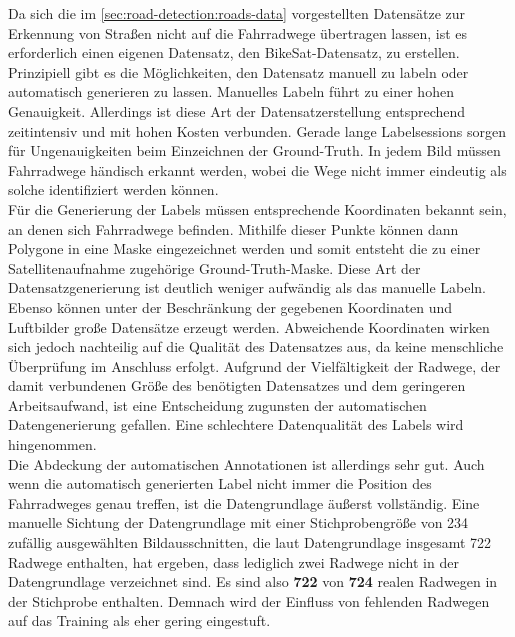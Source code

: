 Da sich die im \autoref{sec:road-detection:roads-data} vorgestellten Datensätze zur Erkennung von Straßen nicht auf die Fahrradwege übertragen lassen, 
ist es erforderlich einen eigenen Datensatz, den BikeSat-Datensatz, zu erstellen.
Prinzipiell gibt es die Möglichkeiten, den Datensatz manuell zu labeln oder automatisch generieren zu lassen.
Manuelles Labeln führt zu einer hohen Genauigkeit.
Allerdings ist diese Art der Datensatzerstellung entsprechend zeitintensiv und mit hohen Kosten verbunden.
Gerade lange Labelsessions sorgen für Ungenauigkeiten beim Einzeichnen der Ground-Truth. 
In jedem Bild müssen Fahrradwege händisch erkannt werden, wobei die Wege nicht immer eindeutig als solche identifiziert werden können.\\
Für die Generierung der Labels müssen entsprechende Koordinaten bekannt sein, an denen sich Fahrradwege befinden.
Mithilfe dieser Punkte können dann Polygone in eine Maske eingezeichnet werden 
und somit entsteht die zu einer Satellitenaufnahme zugehörige Ground-Truth-Maske.
Diese Art der Datensatzgenerierung ist deutlich weniger aufwändig als das manuelle Labeln. 
Ebenso können unter der Beschränkung der gegebenen Koordinaten und Luftbilder große Datensätze erzeugt werden.
Abweichende Koordinaten wirken sich jedoch nachteilig auf die Qualität des Datensatzes aus, da keine menschliche Überprüfung im Anschluss erfolgt.
Aufgrund der Vielfältigkeit der Radwege, der damit verbundenen Größe des benötigten Datensatzes und dem geringeren Arbeitsaufwand, ist eine Entscheidung zugunsten der automatischen Datengenerierung gefallen.
Eine schlechtere Datenqualität des Labels wird hingenommen. \\
Die Abdeckung der automatischen Annotationen ist allerdings sehr gut. Auch wenn die 
automatisch generierten Label nicht immer die Position des Fahrradweges genau treffen, 
ist die Datengrundlage äußerst vollständig. Eine manuelle Sichtung der Datengrundlage mit 
einer Stichprobengröße von 234 zufällig 
ausgewählten Bildausschnitten, die laut Datengrundlage insgesamt 722 Radwege enthalten, hat ergeben, 
dass lediglich zwei Radwege nicht in der Datengrundlage verzeichnet sind. Es sind also \textbf{722} 
von \textbf{724} realen Radwegen in der Stichprobe enthalten. Demnach wird der Einfluss von 
fehlenden Radwegen auf das Training als eher gering eingestuft.   
 

